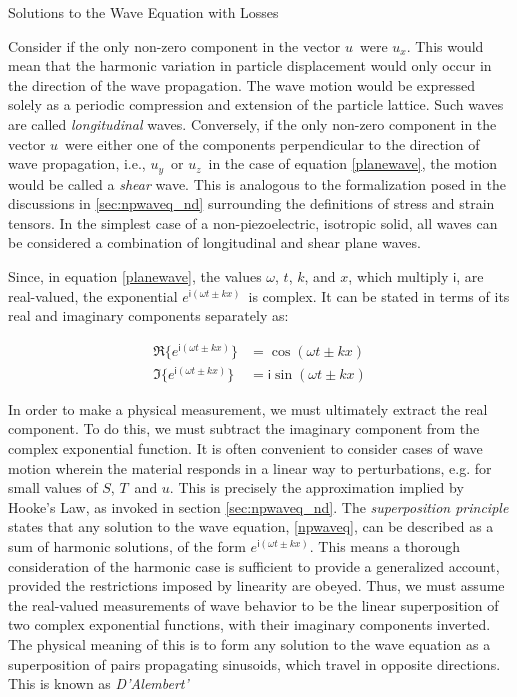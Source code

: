 \documentclass[a4paper,10pt]{report}
\numberwithin{equation}{section}
\begin{document}
{\begin{chapter}
\begin{section}{Solutions to the Wave Equation with Losses}
\par
Consider if the only non-zero component in the vector $u$\  were $u_x$. This would mean that the harmonic variation in particle displacement would only occur in the direction of the wave propagation. The wave motion would be expressed solely as a periodic compression and extension of the particle lattice. Such waves are called \emph{longitudinal} waves. Conversely, if the only non-zero component in the vector $u$\  were either one of the components perpendicular to the direction of wave propagation, i.e., $u_y$\  or $u_z$\  in the case of equation \eqref{planewave}, the motion would be called a \emph{shear} wave. This is analogous to the formalization posed in the discussions in \ref{sec:npwaveq_nd} surrounding the definitions of stress and strain tensors. In the simplest case of a non-piezoelectric, isotropic solid, all waves can be considered a combination of longitudinal and shear plane waves. \cite[p.~15]{Kino1987}
\par
Since, in equation \eqref{planewave}, the values $\omega$, $t$, $k$, and $x$, which multiply $\mathsf{i}$, are real-valued, the exponential $e^{\mathsf{i}(\omega t \pm kx)}$\  is complex. It can be stated in terms of its real and imaginary components separately as\cite[p.~5]{Cremer1973}:
\begin{singlespace}
 \begin{align*}
  \Re \{e^{\mathsf{i}(\omega t \pm kx)}\} &= \cos(\omega t \pm kx)\\
  \Im \{ e^{\mathsf{i}(\omega t \pm kx)}\} &= \mathsf{i} \sin(\omega t \pm kx)
 \end{align*}
\end{singlespace}
In order to make a physical measurement, we must ultimately extract the real component. To do this, we must subtract the imaginary component from the complex exponential function. 
It is often convenient to consider cases of wave motion wherein the material responds in a linear way to perturbations, e.g. for small values of $S$, $T$\  and $u$. This is precisely the approximation implied by Hooke's Law, as invoked in section \ref{sec:npwaveq_nd}. The \emph{superposition principle} states that any solution to the wave equation, \eqref{npwaveq}, can be described as a sum of harmonic solutions, of the form $e^{\mathsf{i}(\omega t \pm kx)}$. This means a thorough consideration of the harmonic case is sufficient to provide a generalized account, provided the restrictions imposed by linearity are obeyed.\cite[p.~5]{Cremer1973} Thus, we must assume the real-valued measurements of wave behavior to be the linear superposition of two complex exponential functions, with their imaginary components inverted. The physical meaning of this is to form any solution to the wave equation as a superposition of pairs propagating sinusoids, which travel in opposite directions. This is known as \emph{D'Alembert'
}
\end{section}
\end{chapter}}
\end{document}
